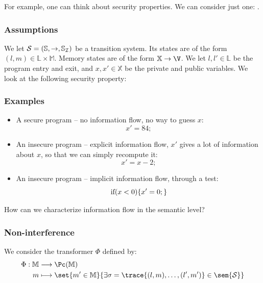 \documentclass[toc, titlepaged]{../cs-classes/cs-classes}
\begin{document}
For example, one can think about security properties. We can consider just one: .

\subsubsection{Assumptions}
We let $\mathcal{S}=(\mathbb{S}, \to, \mathbb{S}_{\mathcal{I}})$ be a transition system. Its states are of the form $(l, m)\in\mathbb{L}\times\mathbb{M}$. Memory states are of the form $\mathbb{X}\to\V$. We let $l, l'\in\mathbb{L}$ be the program entry and exit, and $x, x'\in\mathbb{X}$ be the private and public variables. We look at the following security property:
\begin{center}
\end{center}

\subsubsection{Examples}
\begin{itemize}
    \item A secure program -- no information flow, no way to guess $x$:
    \begin{equation*}
        x' = 84;
    \end{equation*}
    \item An insecure program -- explicit information flow, $x'$ gives a lot of information about $x$, so that we can simply recompute it:
    \begin{equation*}
        x'=x-2;
    \end{equation*}
    \item An insecure program -- implicit information flow, through a test:
    \begin{equation*}
        \textnormal{if} (x<0) \{ x'=0; \}
    \end{equation*}
\end{itemize}
How can we characterize information flow in the semantic level?

\subsubsection{Non-interference}
We consider the transformer $\Phi$ defined by:
\begin{equation*}
    \begin{aligned}
        \Phi : \mathbb{M} &\longrightarrow \Pc(\mathbb{M})\\
        m &\longmapsto \set{m'\in\mathbb{M}}{\exists \sigma = \trace{(l, m), \dots, (l', m')}\in\sem{\Sc}}
    \end{aligned}
\end{equation*}
\end{document}
